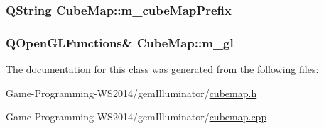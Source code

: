 \subsubsection[{m\+\_\+cube\+Map\+Prefix}]{\setlength{\rightskip}{0pt plus 5cm}Q\+String Cube\+Map\+::m\+\_\+cube\+Map\+Prefix\hspace{0.3cm}{\ttfamily [protected]}}\label{class_cube_map_a74ee2f47f59a87bc920c96396a7b33d5}
\hypertarget{class_cube_map_aab54def10539c674bd20212eea34a1f0}{}
\subsubsection[{m\+\_\+gl}]{\setlength{\rightskip}{0pt plus 5cm}Q\+Open\+G\+L\+Functions\& Cube\+Map\+::m\+\_\+gl\hspace{0.3cm}{\ttfamily [protected]}}\label{class_cube_map_aab54def10539c674bd20212eea34a1f0}


The documentation for this class was generated from the following files\+:\begin{DoxyCompactItemize}
\item 
Game-\/\+Programming-\/\+W\+S2014/gem\+Illuminator/\hyperlink{cubemap_8h}{cubemap.\+h}\item 
Game-\/\+Programming-\/\+W\+S2014/gem\+Illuminator/\hyperlink{cubemap_8cpp}{cubemap.\+cpp}\end{DoxyCompactItemize}
